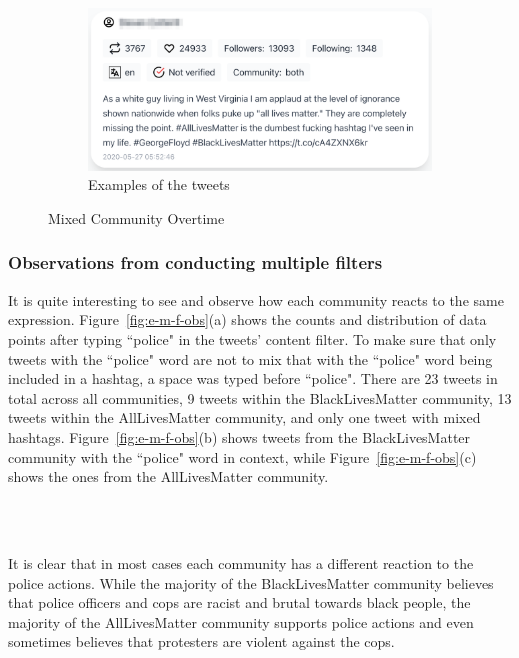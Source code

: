 \begin{figure}[H]
\begin{subfigure}{.5\textwidth}
  \\\
  
  \includegraphics[width=1\linewidth]{Report-latex/tex_files/pics/example/obserm2.png}
  \caption{Examples of the tweets}
  \label{fig:sub-second}
\end{subfigure}

\captionsetup{justification=centering}
\caption{Mixed Community Overtime}
\label{fig:e-mixed-overtime}
\end{figure}


\subsubsection{Observations from conducting multiple filters}

It is quite interesting to see and observe how each community reacts to the same expression. Figure~\ref{fig:e-m-f-obs}(a) shows the counts and distribution of data points after typing ``police" in the tweets' content filter. To make sure that only tweets with the ``police" word are not to mix that with the ``police" word being included in a hashtag, a space was typed before ``police". There are 23 tweets in total across all communities, 9 tweets within the BlackLivesMatter community, 13 tweets within the AllLivesMatter community, and only one tweet with mixed hashtags. Figure~\ref{fig:e-m-f-obs}(b) shows tweets from 
the BlackLivesMatter community with the ``police" word in context, while Figure~\ref{fig:e-m-f-obs}(c) shows the ones from the AllLivesMatter community. 

\\\

It is clear that in most cases each community has a different reaction to the police actions. While the majority of the BlackLivesMatter community believes that police officers and cops are racist and brutal towards black people, the majority of the AllLivesMatter community supports police actions and even sometimes believes that protesters are violent against the cops.   


